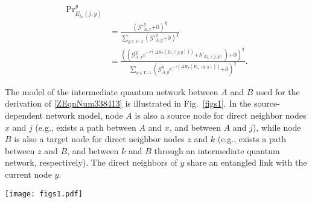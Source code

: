 \documentclass[11pt]{article}%
\newcommand{\fref}[1]{Fig.~\ref{#1}}
\begin{document}
\begin{equation} \label{5)} 
\begin{split}
\mathrm{P}{\mathrm{r}}^y_{E_{{\mathrm{L}}_l}\left(j,y\right)}\\&\mathrm{=}\frac{{\left({\mathcal{G}}'^y_{A,x}\mathrm{+}\mathrm{\partial }\right)}^{\chi }}{\sum_{g\mathrm{\in }V\mathrm{-}z}{{\left({\mathcal{G}}'^y_{A,g}\mathrm{+}\mathrm{\partial }\right)}^{\chi }}}\\&\mathrm{=}\frac{{\left(\left({\mathcal{G}}^y_{A,x}e^{\mathrm{-}\tau \left(\mathit{\Delta}B_F\left(E_{{\mathrm{L}}_l}\left(j,y\right)\right)\right)}\mathrm{+}{\lambda }'_{E_{{\mathrm{L}}_l}\left(j,y\right)}\right)\mathrm{+}\mathrm{\partial }\right)}^{\chi }}{\sum_{g\mathrm{\in }V\mathrm{-}z}{{\left({\mathcal{G}}^y_{A,g}e^{\mathrm{-}\tau \left(\mathit{\Delta}B_F\left(E_{{\mathrm{L}}_l}\left(g,y\right)\right)\right)}\mathrm{+}\mathrm{\partial }\right)}^{\chi }}}.              
\end{split}
\end{equation} 

The model of the intermediate quantum network between $A$ and $B$ used for the derivation of \eqref{ZEqnNum338413} is illustrated in \fref{figs1}. In the source-dependent network model, node $A$ is also a source node for direct neighbor nodes $x$ and $j$ (e.g., exists a path between $A$ and $x$, and between $A$ and $j$), while node $B$ is also a target node for direct neighbor nodes $z$ and $k$  (e.g., exists a path between $z$ and $B$, and between $k$ and $B$ through an intermediate quantum network, respectively). The direct neighbors of $y$ share an entangled link with the current node $y$. 
\\
\begin{figure*}[h!]
\vspace{-0.6cm}
 \begin{center}
 	 \texttt{[image: figs1.pdf]}

\caption{Modeling source-dependent link selection through an intermediate network between quantum nodes $A$ and $B$. The current node is $y$, with source node $A$ and destination node $B$. The current direct neighbor of $y$ with a path to source node $A$ is $x$, while node $z$ is the current direct neighbor of $y$ with a path to target node $B$. Node $j$ (gray) models a set of other neighbors of $y$ with paths to source $A$, $j\mathrm{\in }V\mathrm{-}x$, while node $k$ (gray) models a set of other neighbor of $y$ with path to destination $B$, $k\mathrm{\in }V\mathrm{-}z$. Each direct neighbor has en entangled connection with $y$, denoted by $E_{{\mathrm{L}}_l}\left(x,y\right)$, $E_{{\mathrm{L}}_l}\left(y,z\right)$, and $E_{{\mathrm{L}}_l}\left(j,y\right)$, $E_{{\mathrm{L}}_l}\left(y,k\right)$. The entangled links are characterized by entanglement throughputs $B_F\left(E_{{\mathrm{L}}_l}\left(\mathrm{\cdot }\right)\right)$, from which $\mathit{\Delta}B_F\left(E_{{\mathrm{L}}_l}\left(y,z\right)\right)$ is determined in node $y$ to evaluate the entanglement gradient.}
\label{figs1}
\end{center}
\end{figure*}
\end{document}

